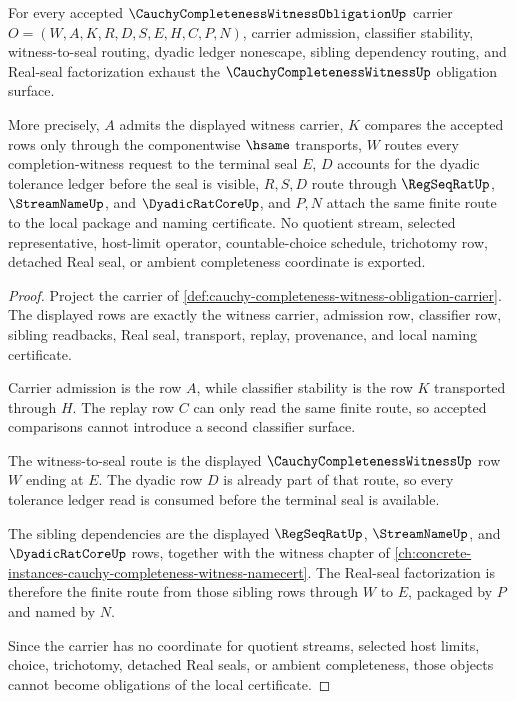\begin{theorem}
\label{thm:cauchy-completeness-witness-obligation-closure-package}
For every accepted $\CauchyCompletenessWitnessObligationUp$ carrier $O=(W,A,K,R,D,S,E,H,C,P,N)$, carrier admission, classifier stability, witness-to-seal routing, dyadic ledger nonescape, sibling dependency routing, and Real-seal factorization exhaust the $\CauchyCompletenessWitnessUp$ obligation surface.

More precisely, $A$ admits the displayed witness carrier, $K$ compares the accepted rows only through the componentwise $\hsame$ transports, $W$ routes every completion-witness request to the terminal seal $E$, $D$ accounts for the dyadic tolerance ledger before the seal is visible, $R,S,D$ route through $\RegSeqRatUp$, $\StreamNameUp$, and $\DyadicRatCoreUp$, and $P,N$ attach the same finite route to the local package and naming certificate. No quotient stream, selected representative, host-limit operator, countable-choice schedule, trichotomy row, detached Real seal, or ambient completeness coordinate is exported.
\end{theorem}
\begin{proof}
Project the carrier of \autoref{def:cauchy-completeness-witness-obligation-carrier}. The displayed rows are exactly the witness carrier, admission row, classifier row, sibling readbacks, Real seal, transport, replay, provenance, and local naming certificate.

Carrier admission is the row $A$, while classifier stability is the row $K$ transported through $H$. The replay row $C$ can only read the same finite route, so accepted comparisons cannot introduce a second classifier surface.

The witness-to-seal route is the displayed $\CauchyCompletenessWitnessUp$ row $W$ ending at $E$. The dyadic row $D$ is already part of that route, so every tolerance ledger read is consumed before the terminal seal is available.

The sibling dependencies are the displayed $\RegSeqRatUp$, $\StreamNameUp$, and $\DyadicRatCoreUp$ rows, together with the witness chapter of \autoref{ch:concrete-instances-cauchy-completeness-witness-namecert}. The Real-seal factorization is therefore the finite route from those sibling rows through $W$ to $E$, packaged by $P$ and named by $N$.

Since the carrier has no coordinate for quotient streams, selected host limits, choice, trichotomy, detached Real seals, or ambient completeness, those objects cannot become obligations of the local certificate.
\end{proof}

